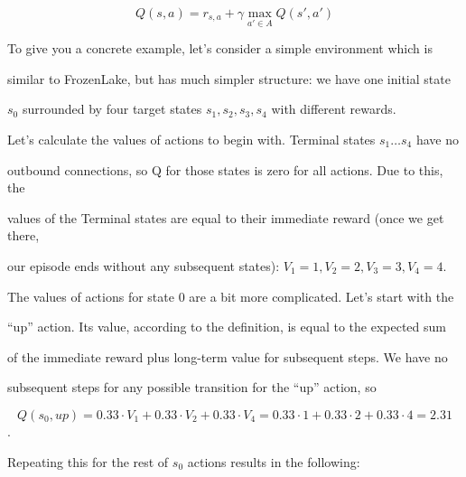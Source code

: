 \begin{equation*}

Q(s,a)=r_{s,a} + \gamma \max_{a' \in A}Q(s',a')

\end{equation*}


To give you a concrete example, let’s consider a simple environment which is

similar to FrozenLake, but has much simpler structure: we have one initial state

\begin{math}s_0\end{math} surrounded by four target states \begin{math}s_1, s_2, s_3, s_4\end{math} with different rewards.


Let’s calculate the values of actions to begin with. Terminal states \begin{math}s_1 \ldots s_4\end{math} have no

outbound connections, so Q for those states is zero for all actions. Due to this, the

values of the Terminal states are equal to their immediate reward (once we get there,

our episode ends without any subsequent states): \begin{math}V_1 = 1, V_2 = 2, V_3 = 3, V_4 = 4\end{math}.

The values of actions for state 0 are a bit more complicated. Let’s start with the

“up” action. Its value, according to the definition, is equal to the expected sum

of the immediate reward plus long-term value for subsequent steps. We have no

subsequent steps for any possible transition for the “up” action, so

\begin{equation*}

Q(s_0, up) = 0.33 \cdot V_1 + 0.33 \cdot V_2 + 0.33 \cdot V_4 = 0.33 \cdot 1 + 0.33 \cdot 2 + 0.33 \cdot 4 = 2.31

\end{equation*}.


Repeating this for the rest of \begin{math}s_0\end{math} actions results in the following:


